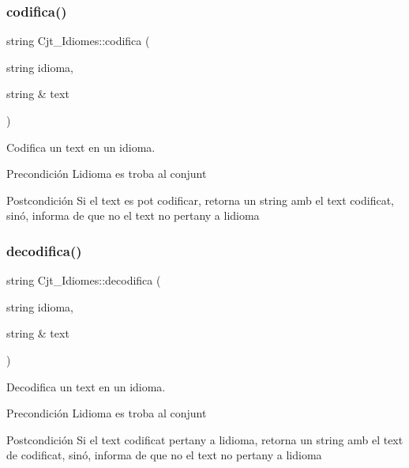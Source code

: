 \subsubsection{\texorpdfstring{codifica()}{codifica()}}
{\footnotesize\ttfamily string Cjt\+\_\+\+Idiomes\+::codifica (\begin{DoxyParamCaption}\item[{string}]{idioma,  }\item[{string \&}]{text }\end{DoxyParamCaption})}



Codifica un text en un idioma. 

\begin{DoxyPrecond}{Precondición}
L\textquotesingle{}idioma es troba al conjunt 
\end{DoxyPrecond}
\begin{DoxyPostcond}{Postcondición}
Si el text es pot codificar, retorna un string amb el text codificat, sinó, informa de que no el text no pertany a l\textquotesingle{}idioma 
\end{DoxyPostcond}
\mbox{\label{class_cjt___idiomes_ab77062c4c2b311bbc1fc1143073bc036}} 
\subsubsection{\texorpdfstring{decodifica()}{decodifica()}}
{\footnotesize\ttfamily string Cjt\+\_\+\+Idiomes\+::decodifica (\begin{DoxyParamCaption}\item[{string}]{idioma,  }\item[{string \&}]{text }\end{DoxyParamCaption})}



Decodifica un text en un idioma. 

\begin{DoxyPrecond}{Precondición}
L\textquotesingle{}idioma es troba al conjunt 
\end{DoxyPrecond}
\begin{DoxyPostcond}{Postcondición}
Si el text codificat pertany a l\textquotesingle{}idioma, retorna un string amb el text de codificat, sinó, informa de que no el text no pertany a l\textquotesingle{}idioma 
\end{DoxyPostcond}
\mbox{\label{class_cjt___idiomes_af0cfe6e69c1784af172fe825bdbe61f8}} 
